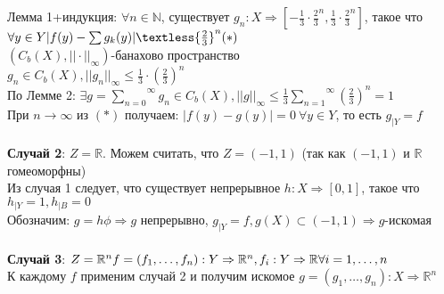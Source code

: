 	Лемма 1+индукция: $\forall n\in \mathbb{N}$, существует $g_n: X \Rightarrow [ - \frac{1}{3}\cdot {\frac{2}{3}}^n, \frac{1}{3}\cdot {\frac{2}{3}}^n]$, такое что $\forall y\in Y |f(y)- \sum g_k (y)| \textless {\frac{2}{3}}^n (*)$\\
	$(C_b(X), ||\cdot||_{\infty})$-банахово пространство\\
	$g_n\in C_b(X), ||g_n||_{\infty} \leqslant \frac{1}{3} \cdot ({\frac{2}{3}})^n$\\
	По Лемме 2: $\exists g=\overset{\infty}{\underset{n = 0}{\sum}} g_n \in C_b (X), ||g||_{\infty} \leqslant \frac{1}{3} \overset{\infty}{\underset{n = 1}{\sum}} (\frac{2}{3})^n=1$\\
	При $n\to \infty$ из $(*)$ получаем: $|f(y) - g(y)|=0\ \forall y \in Y$, то есть $g_{|Y} = f$\\
	\\
	\textbf{Случай 2}: $Z=\mathbb{R}$. Можем считать, что $Z=( - 1,1)$ (так как $( - 1,1)$ и $\mathbb{R}$ гомеоморфны)\\
	Из случая 1 следует, что существует непрерывное $h: X \Rightarrow [0,1]$, такое что $h_{|Y}=1, h_{|B}=0$\\
	Обозначим: $g=h \phi \Rightarrow g$ непрерывно, $g_{|Y}=f, g(X) \subset ( - 1,1) \Rightarrow g$-искомая\\
	\\
	\textbf{Случай 3}: $Z=\mathbb{R}^n\\
	f=(f_1, \ldots , f_n): Y\Rightarrow \mathbb{R}^n, f_i : Y \Rightarrow \mathbb{R} \forall i= 1,\ldots , n$\\
	К каждому $f$ применим случай 2 и получим искомое $g=(g_1,\ldots ,g_n): X\Rightarrow \mathbb{R}^n $

